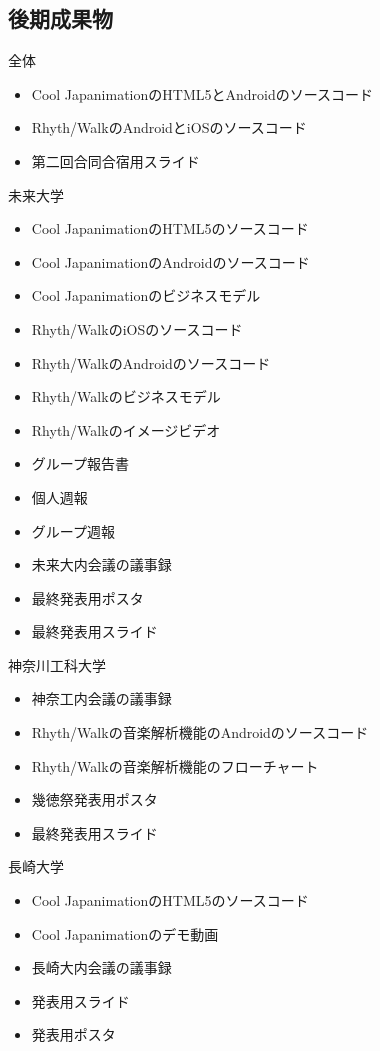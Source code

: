 \subsection{後期成果物}

全体
\begin{itemize}
\item Cool JapanimationのHTML5とAndroidのソースコード
\item Rhyth/WalkのAndroidとiOSのソースコード
\item 第二回合同合宿用スライド
\end{itemize}

未来大学
\begin{itemize}
\item Cool JapanimationのHTML5のソースコード
\item Cool JapanimationのAndroidのソースコード
\item Cool Japanimationのビジネスモデル
\item Rhyth/WalkのiOSのソースコード
\item Rhyth/WalkのAndroidのソースコード
\item Rhyth/Walkのビジネスモデル
\item Rhyth/Walkのイメージビデオ
\item グループ報告書
\item 個人週報
\item グループ週報
\item 未来大内会議の議事録
\item 最終発表用ポスタ
\item 最終発表用スライド
\end{itemize}

神奈川工科大学
\begin{itemize}
\item 神奈工内会議の議事録
\item Rhyth/Walkの音楽解析機能のAndroidのソースコード
\item Rhyth/Walkの音楽解析機能のフローチャート
\item 幾徳祭発表用ポスタ
\item 最終発表用スライド
\end{itemize}

長崎大学
\begin{itemize}
\item Cool JapanimationのHTML5のソースコード
\item Cool Japanimationのデモ動画
\item 長崎大内会議の議事録
\item 発表用スライド
\item 発表用ポスタ
\end{itemize}
